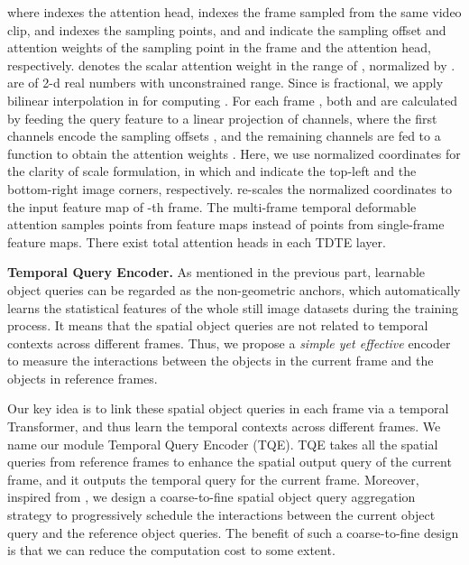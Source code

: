 \documentclass[10pt,journal,compsoc]{IEEEtran}
\begin{document}
where  indexes the attention head,  indexes the frame sampled from the same video clip, and  indexes the sampling points, and  and  indicate the sampling offset and attention weights of the  sampling point in the  frame and the  attention head, respectively.
 denotes the scalar attention weight in the range of , normalized by .  are of 2-d real numbers with unconstrained range. Since  is
fractional, we apply bilinear interpolation in \cite{dai2017deformable} for computing .
For each frame , both  and  are calculated by feeding the query feature  to a linear projection of  channels, where the first  channels encode the sampling offsets , and the remaining  channels are fed to a  function to obtain the attention weights .
Here, we use normalized coordinates  for the clarity of scale formulation, in which   and  indicate the top-left and the bottom-right image corners, respectively.   re-scales the normalized coordinates  to the input feature map of  -th frame. The multi-frame temporal deformable attention samples  points from  feature maps instead of  points from single-frame feature maps. There exist total  attention heads in each TDTE layer.

\noindent
\textbf{Temporal Query Encoder.}
As mentioned in the previous part, learnable object queries can be regarded as the non-geometric anchors, which automatically learns the statistical features of the whole still image datasets during the training process. It means that the spatial object queries are not related to temporal contexts across different frames. Thus, we propose a \emph{simple yet effective} encoder to measure the interactions between the objects in the current frame and the objects in reference frames. 

Our key idea is to link these spatial object queries in each frame via a temporal Transformer, and thus learn the temporal contexts across different frames. We name our module Temporal Query Encoder (TQE). TQE takes all the spatial queries from reference frames to enhance the spatial output query of the current frame, and it outputs the temporal query for the current frame. Moreover, inspired from \cite{deng19rdn}, we design a coarse-to-fine spatial object query aggregation strategy to progressively schedule the interactions between the current object query and the reference object queries. The benefit of such a coarse-to-fine design is that we can reduce the computation cost to some extent. 
\end{document}
